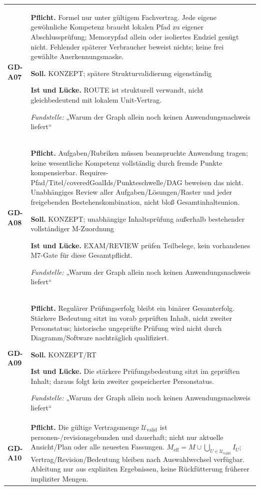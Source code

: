 \begin{longtable}{@{}P{20mm}P{128mm}@{}}
\label{rule:GD-A07}\textbf{GD-A07} &
\textbf{Pflicht.} Formel nur unter gültigem Fachvertrag. Jede eigene gewöhnliche Kompetenz braucht lokalen Pfad zu eigener Abschlussprüfung; Memorypfad allein oder isoliertes Endziel genügt nicht. Fehlender späterer Verbraucher beweist nichts; keine frei gewählte Anerkennungsmaske.\par\smallskip
\textbf{Soll.} KONZEPT; spätere Strukturvalidierung eigenständig\par\smallskip
\textbf{Ist und Lücke.} ROUTE ist strukturell verwandt, nicht gleichbedeutend mit lokalem Unit-Vertrag.\par\smallskip
\emph{Fundstelle:} „Warum der Graph allein noch keinen Anwendungsnachweis liefert“\\\addlinespace[5pt]
\label{rule:GD-A08}\textbf{GD-A08} &
\textbf{Pflicht.} Aufgaben/Rubriken müssen beanspruchte Anwendung tragen; keine wesentliche Kompetenz vollständig durch fremde Punkte kompensierbar. Requires-Pfad/Titel/coveredGoalIds/Punkteschwelle/DAG beweisen das nicht. Unabhängiges Review aller Aufgaben/Lösungen/Raster und jeder freigebenden Bestehenskombination, nicht bloß Gesamtinhaltsunion.\par\smallskip
\textbf{Soll.} KONZEPT; unabhängige Inhaltsprüfung außerhalb bestehender vollständiger M-Zuordnung\par\smallskip
\textbf{Ist und Lücke.} EXAM/REVIEW prüfen Teilbelege, kein vorhandenes M7-Gate für diese Gesamtpflicht.\par\smallskip
\emph{Fundstelle:} „Warum der Graph allein noch keinen Anwendungsnachweis liefert“\\\addlinespace[5pt]
\label{rule:GD-A09}\textbf{GD-A09} &
\textbf{Pflicht.} Regulärer Prüfungserfolg bleibt ein binärer Gesamterfolg. Stärkere Bedeutung sitzt im vorab geprüften Inhalt, nicht zweiter Personstatus; historische ungeprüfte Prüfung wird nicht durch Diagramm/Software nachträglich qualifiziert.\par\smallskip
\textbf{Soll.} KONZEPT/RT\par\smallskip
\textbf{Ist und Lücke.} Die stärkere Prüfungsbedeutung sitzt im geprüften Inhalt; daraus folgt kein zweiter gespeicherter Personstatus.\par\smallskip
\emph{Fundstelle:} „Warum der Graph allein noch keinen Anwendungsnachweis liefert“\\\addlinespace[5pt]
\label{rule:GD-A10}\textbf{GD-A10} &
\textbf{Pflicht.} Die gültige Vertragsmenge \(\mathcal U_{\mathrm{valid}}\) ist personen-/revisionsgebunden und dauerhaft; nicht nur aktuelle Ansicht/Plan oder alle neuesten Fassungen. \(M_{\mathrm{eff}}=M\cup\bigcup_{U\in\mathcal U_{\mathrm{valid}}} I_U\); Vertrag/Revision/Bedeutung bleiben nach Auswahlwechsel verfügbar. Ableitung nur aus expliziten Ergebnissen, keine Rückfütterung früherer impliziter Mengen.\par\smallskip

\end{longtable}
